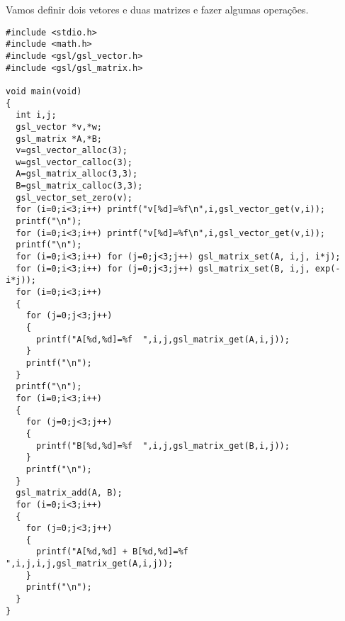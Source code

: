 \begin{ex}Vamos definir dois vetores e duas matrizes e fazer algumas operações.
\end{ex}
\begin{verbatim}
#include <stdio.h>
#include <math.h>
#include <gsl/gsl_vector.h>
#include <gsl/gsl_matrix.h>

void main(void)
{
  int i,j;
  gsl_vector *v,*w;
  gsl_matrix *A,*B;
  v=gsl_vector_alloc(3);
  w=gsl_vector_calloc(3);
  A=gsl_matrix_alloc(3,3);
  B=gsl_matrix_calloc(3,3);
  gsl_vector_set_zero(v);
  for (i=0;i<3;i++) printf("v[%d]=%f\n",i,gsl_vector_get(v,i));
  printf("\n");
  for (i=0;i<3;i++) printf("v[%d]=%f\n",i,gsl_vector_get(v,i));
  printf("\n");
  for (i=0;i<3;i++) for (j=0;j<3;j++) gsl_matrix_set(A, i,j, i*j);
  for (i=0;i<3;i++) for (j=0;j<3;j++) gsl_matrix_set(B, i,j, exp(-i*j));
  for (i=0;i<3;i++) 
  {
    for (j=0;j<3;j++) 
    {
      printf("A[%d,%d]=%f  ",i,j,gsl_matrix_get(A,i,j));
    }
    printf("\n");
  }
  printf("\n");
  for (i=0;i<3;i++) 
  {
    for (j=0;j<3;j++) 
    {
      printf("B[%d,%d]=%f  ",i,j,gsl_matrix_get(B,i,j));
    }
    printf("\n");
  }
  gsl_matrix_add(A, B);
  for (i=0;i<3;i++) 
  {
    for (j=0;j<3;j++) 
    {
      printf("A[%d,%d] + B[%d,%d]=%f  ",i,j,i,j,gsl_matrix_get(A,i,j));
    }
    printf("\n");
  }
}
\end{verbatim}


